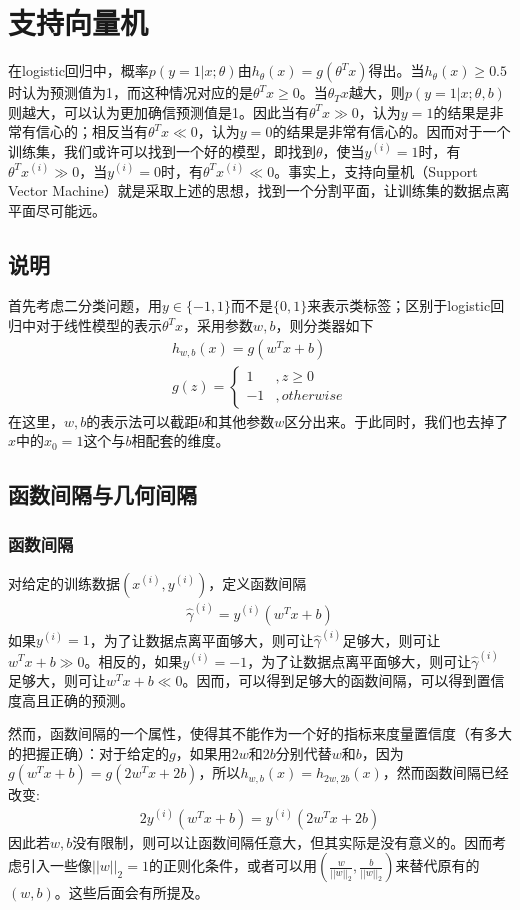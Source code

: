 \section{支持向量机}
在logistic回归中，概率$p(y=1|x;\theta)$由$h_\theta(x)=g(\theta^Tx)$得出。当$h_\theta(x)\geq 0.5$时认为预测值为1，而这种情况对应的是$\theta^Tx\geq0$。当$\theta_Tx$越大，则$p(y=1|x;\theta,b)$则越大，可以认为更加确信预测值是1。因此当有$\theta^Tx\gg0$，认为$y=1$的结果是非常有信心的；相反当有$\theta^Tx\ll0$，认为$y=0$的结果是非常有信心的。因而对于一个训练集，我们或许可以找到一个好的模型，即找到$\theta$，使当$y^{(i)}=1$时，有$\theta^Tx^{(i)}\gg0$，当$y^{(i)}=0$时，有$\theta^Tx^{(i)}\ll0$。事实上，支持向量机（Support Vector Machine）就是采取上述的思想，找到一个分割平面，让训练集的数据点离平面尽可能远。
\subsection{说明}
首先考虑二分类问题，用$y\in\{-1,1\}$而不是$\{0,1\}$来表示类标签；区别于logistic回归中对于线性模型的表示$\theta^Tx$，采用参数$w,b$，则分类器如下
\begin{eqnarray}
h_{w,b}(x)=g(w^Tx+b)\\
g(z)=
\left\lbrace
\begin{aligned}
1&, z\geq 0\\
-1&, otherwise
\end{aligned}
\right.
\end{eqnarray}
在这里，$w,b$的表示法可以截距$b$和其他参数$w$区分出来。于此同时，我们也去掉了$x$中的$x_0=1$这个与$b$相配套的维度。
\subsection{函数间隔与几何间隔}
\subsubsection{函数间隔}
对给定的训练数据$(x^{(i)},y^{(i)})$，定义函数间隔
\begin{eqnarray}
\hat{\gamma}^{(i)}=y^{(i)}(w^Tx+b)
\end{eqnarray}
如果$y^{(i)}=1$，为了让数据点离平面够大，则可让$\hat{\gamma}^{(i)}$足够大，则可让$w^Tx+b\gg0$。相反的，如果$y^{(i)}=-1$，为了让数据点离平面够大，则可让$\hat{\gamma}^{(i)}$足够大，则可让$w^Tx+b\ll0$。因而，可以得到足够大的函数间隔，可以得到置信度高且正确的预测。

然而，函数间隔的一个属性，使得其不能作为一个好的指标来度量置信度（有多大的把握正确）：对于给定的$g$，如果用$2w$和$2b$分别代替$w$和$b$，因为$g(w^Tx+b)=g(2w^Tx+2b)$，所以$h_{w,b}(x)=h_{2w,2b}(x)$，然而函数间隔已经改变:
\begin{eqnarray}
2y^{(i)}(w^Tx+b)=y^{(i)}(2w^Tx+2b)
\end{eqnarray}
因此若$w,b$没有限制，则可以让函数间隔任意大，但其实际是没有意义的。因而考虑引入一些像$||w||_2=1$的正则化条件，或者可以用$(\frac{w}{||w||_2},\frac{b}{||w||_2})$来替代原有的$(w,b)$。这些后面会有所提及。

